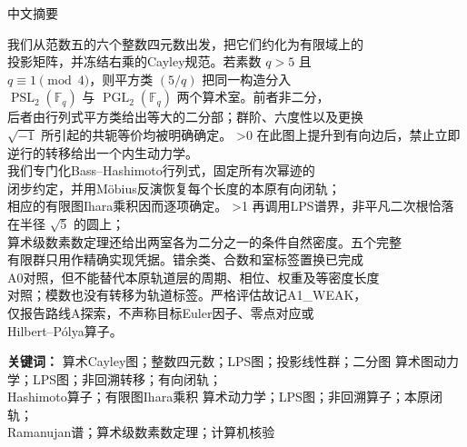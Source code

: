 \documentclass[10pt]{article}
\providecommand{\CRevisionRound}{2}
\newcommand{\Fq}{\mathbb F_q}
\newcommand{\PSL}{\operatorname{PSL}}
\newcommand{\PGL}{\operatorname{PGL}}
\begin{document}
\begin{center}{\zhfont\large 中文摘要}\end{center}
{\zhfont
\begin{flushleft}
我们从范数五的六个整数四元数出发，把它们约化为有限域上的\\
投影矩阵，并冻结右乘的{\normalfont Cayley}规范。若素数 $q>5$ 且\\
$q\equiv1\pmod4$，则平方类 $(5/q)$ 把同一构造分入\\
$\PSL_2(\Fq)$ 与 $\PGL_2(\Fq)$ 两个算术室。前者非二分，\\
后者由行列式平方类给出等大的二分部；群阶、六度性以及更换\\
$\sqrt{-1}$ 所引起的共轭等价均被明确确定。
\ifnum\CRevisionRound>0
在此图上提升到有向边后，禁止立即逆行的转移给出一个内生动力学。\\
我们专门化{\normalfont Bass--Hashimoto}行列式，固定所有次幂迹的\\
闭步约定，并用{\normalfont M\"obius}反演恢复每个长度的本原有向闭轨；\\
相应的有限图{\normalfont Ihara}乘积因而逐项确定。
\fi
\ifnum\CRevisionRound>1
再调用{\normalfont LPS}谱界，非平凡二次根恰落在半径 $\sqrt5$ 的圆上；\\
算术级数素数定理还给出两室各为二分之一的条件自然密度。五个完整\\
有限群只用作精确实现凭据。错余类、合数和室标签置换已完成\\
{\normalfont A0}对照，但不能替代本原轨道层的周期、相位、权重及等密度长度\\
对照；模数也没有转移为轨道标签。严格评估故记{\normalfont A1\_WEAK}，\\
仅报告路线{\normalfont A}探索，不声称目标{\normalfont Euler}因子、零点对应或\\
{\normalfont Hilbert--P\'olya}算子。
\fi

\textbf{关键词：}
\ifcase\CRevisionRound
算术{\normalfont Cayley}图；整数四元数；{\normalfont LPS}图；投影线性群；二分图
\or
算术图动力学；{\normalfont LPS}图；非回溯转移；有向闭轨；\\
{\normalfont Hashimoto}算子；有限图{\normalfont Ihara}乘积
\else
算术动力学；{\normalfont LPS}图；非回溯算子；本原闭轨；\\
{\normalfont Ramanujan}谱；算术级数素数定理；计算机核验
\fi
\end{flushleft}
}
\end{document}
